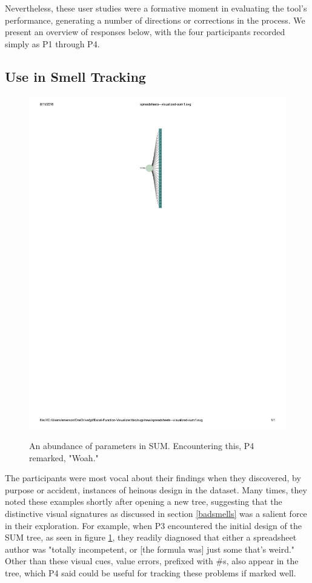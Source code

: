 \documentclass[conference]{IEEEtran}
\begin{document}
	Nevertheless, these user studies were a formative moment in evaluating the
	tool's performance, generating a number of directions or corrections in the
	process. We present an overview of responses below, with the four participants
	recorded simply as P1 through P4. \par
	
	\subsection{Use in Smell Tracking} \begin{figure}
		\centering \includegraphics{SUM} \label{fig:sum} \caption{An abundance of
			parameters in SUM. Encountering this, P4 remarked, "Woah."} \end{figure}
	
	The participants were most vocal about their findings when they discovered, by
	purpose or accident, instances of heinous design in the dataset. Many times,
	they noted these examples shortly after opening a new tree, suggesting that the
	distinctive visual signatures as discussed in section \ref{badsmells} was a
	salient force in their exploration. For example, when P3 encountered the
	initial design of the SUM tree, as seen in figure \ref{fig:sum}, they readily
	diagnosed that either a spreadsheet author was "totally incompetent, or [the
	formula was] just some that's weird." Other than these visual cues, value
	errors, prefixed with \#s, also appear in the tree, which P4 said could be
	useful for tracking these problems if marked well.
	
\end{document}
